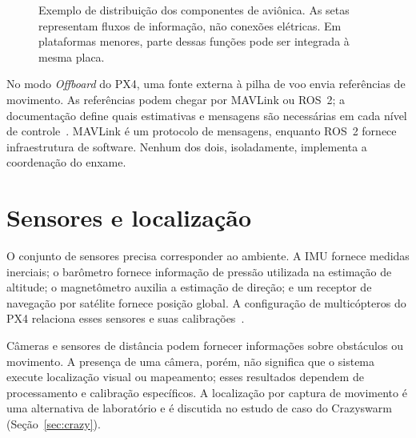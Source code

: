 \documentclass[11pt,a4paper,oneside]{book}
\numberwithin{equation}{chapter}
\begin{document}
\begin{figure}[htbp]
\centering
{}
\caption[Distribuição dos componentes de aviônica]{Exemplo de distribuição dos componentes de aviônica. As setas representam fluxos de informação, não conexões elétricas. Em plataformas menores, parte dessas funções pode ser integrada à mesma placa.}
\label{fig:avionica}
\end{figure}

No modo \emph{Offboard} do PX4, uma fonte externa à pilha de voo envia referências de movimento. As referências podem chegar por MAVLink ou ROS~2; a documentação define quais estimativas e mensagens são necessárias em cada nível de controle~\cite{offboard}. MAVLink é um protocolo de mensagens, enquanto ROS~2 fornece infraestrutura de software. Nenhum dos dois, isoladamente, implementa a coordenação do enxame.

\section{Sensores e localização}
O conjunto de sensores precisa corresponder ao ambiente. A IMU fornece medidas inerciais; o barômetro fornece informação de pressão utilizada na estimação de altitude; o magnetômetro auxilia a estimação de direção; e um receptor de navegação por satélite fornece posição global. A configuração de multicópteros do PX4 relaciona esses sensores e suas calibrações~\cite{config}.

Câmeras e sensores de distância podem fornecer informações sobre obstáculos ou movimento. A presença de uma câmera, porém, não significa que o sistema execute localização visual ou mapeamento; esses resultados dependem de processamento e calibração específicos. A localização por captura de movimento é uma alternativa de laboratório e é discutida no estudo de caso do Crazyswarm (Seção~\ref{sec:crazy}).
\end{document}
